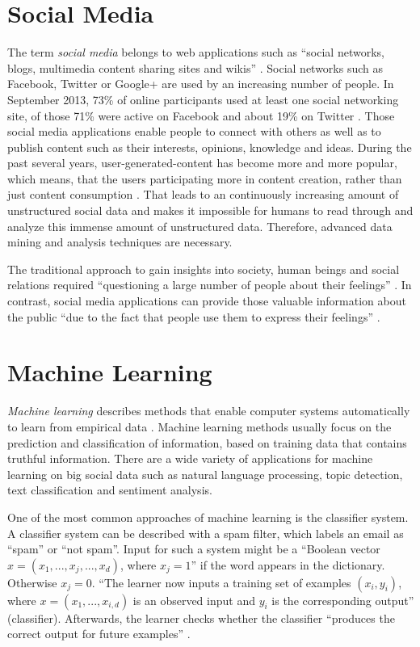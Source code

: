 \section{Social Media}
\label{sec:social-media}
The term \textit{social media} belongs to web applications such as \enquote{social networks, blogs, multimedia content sharing sites and wikis} \cite{eu2013socialmedia}. Social networks such as Facebook, Twitter or Google+ are used by an increasing number of people. In September 2013, 73\% of online participants used at least one social networking site, of those 71\% were active on Facebook and about 19\% on Twitter \cite{pewresearchsocialmediafact}. Those social media applications enable people to connect with others as well as to publish content such as their interests, opinions, knowledge and ideas. During the past several years, user-generated-content has become more and more popular, which means, that the users participating more in content creation, rather than just content consumption \cite[1]{Agichtein:2008:FHC:1341531.1341557}.  That leads to an continuously increasing amount of unstructured social data and makes it impossible for humans to read through and analyze this immense amount of unstructured data. Therefore, advanced data mining and analysis techniques are necessary. 

The traditional approach to gain insights into society, human beings and social relations required \enquote{questioning a large number of people about their feelings} \cite[1]{flaounas2012big}. In contrast, social media applications can provide those valuable information about the public \enquote{due to the fact that people use them to express their feelings} \cite[1]{flaounas2012big}.

\section{Machine Learning}
\label{sec:machine-learning}
\textit{Machine learning} describes methods that enable computer systems automatically to learn from empirical data \cite{Domingos:2012:FUT:2347736.2347755,McKinsey2011}. Machine learning methods usually focus on the prediction and classification of information, based on training data that contains truthful information. There are a wide variety of applications for machine learning on big social data such as natural language processing, topic detection, text classification and sentiment analysis.

One of the most common approaches of machine learning is the classifier system. A classifier system can be described with a spam filter, which labels an email as \enquote{spam} or \enquote{not spam}. Input for such a system might be a \enquote{Boolean vector $x=(x_{1},...,x_{j},...,x_{d})$, where $x_{j}=1$} if the word appears in the dictionary. Otherwise $x_{j}=0$. \enquote{The learner now inputs a training set of examples $(x_{i}, y_{i})$, where $x=(x_{1},...,x_{i,d})$ is an observed input and $y_{i}$ is the corresponding output} (classifier). Afterwards, the learner checks whether the classifier \enquote{produces the correct output for future examples} \cite[1]{Domingos:2012:FUT:2347736.2347755}.


